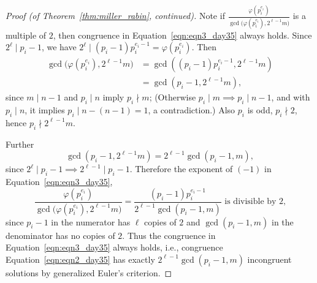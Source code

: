 \documentclass{amsbook}
\theoremstyle{plain}
\theoremstyle{definition}
\theoremstyle{remark}
\numberwithin{equation}{chapter}
\numberwithin{figure}{chapter}
\begin{document}
\begin{proof}[Proof {\rm (of Theorem~\ref{thm:miller_rabin}, continued)}]
Note if $\frac{\varphi (p_i^{e_i})}{\gcd \big(\varphi (p_i^{e_i}), 2^{\ell - 1}m\big)}$ is a multiple of $2$, then congruence in Equation~\eqref{eqn:eqn3_day35} always holds. Since $2^\ell \mid p_i - 1$, we have $2^\ell \mid (p_i - 1)p_i^{e_i - 1}  = \varphi (p_i^{e_i})$. Then 
\begin{align}
  \gcd \big(\varphi (p_i^{e_i}), 2^{\ell - 1}m \big) &= \gcd ((p_i - 1)p_i^{e_i - 1}, 2^{\ell - 1}m) \\
                                            &= \gcd (p_i - 1, 2^{\ell - 1}m),
\end{align}
since $m \mid n - 1$ and $p_i \mid n$ imply $p_i \nmid m$; (Otherwise $p_i \mid m \implies p_i \mid n-1$, and with $p_i \mid n$, it implies $p_i \mid n - (n - 1) = 1$, a contradiction.) Also $p_i$ is odd, $p_i \nmid 2$, hence $p_i \nmid 2^{\ell - 1}m$.

Further
\[
  \gcd (p_i - 1, 2^{\ell - 1}m) = 2^{\ell - 1} \gcd (p_i - 1, m),
\]
since $2^\ell \mid p_i - 1 \implies 2^{\ell - 1} \mid p_i - 1$.
Therefore the exponent of $(-1)$ in Equation~\eqref{eqn:eqn3_day35},
\[
\frac{\varphi (p_i^{e_i})}{\gcd \big(\varphi (p_i^{e_i}), 2^{\ell - 1}m\big)} = \frac{(p_i - 1)p_i^{e_i - 1}}{2^{\ell - 1} \gcd (p_i - 1, m)} \text{ is divisible by $2$,}
\]
since $p_i - 1$ in the numerator has $\ell$ copies of $2$ and $\gcd (p_i - 1, m)$ in the denominator has no copies of $2$. Thus the congruence in Equation~\eqref{eqn:eqn3_day35} always holds, i.e., congruence Equation~\eqref{eqn:eqn2_day35} has exactly $2^{\ell - 1} \gcd (p_i - 1, m)$ incongruent solutions by generalized Euler's criterion. 


\end{proof}
\end{document}
